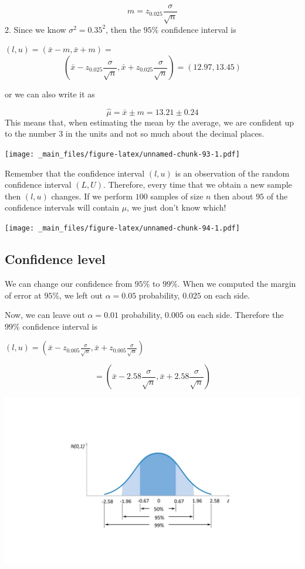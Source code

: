 \documentclass[
]{book}
\begin{document}
\[m=z_{0.025} \frac{\sigma}{\sqrt{n}}\]
2. Since we know \(\sigma^2=0.35^2\), then the \(95\%\) confidence interval is

\((l,u)=(\bar{x} - m, \bar{x} + m)=\) \[(\bar{x}-z_{0.025} \frac{\sigma}{\sqrt{n}}, \bar{x}+z_{0.025} \frac{\sigma}{\sqrt{n}})= (12.97,13.45)\]

or we can also write it as

\[\hat{\mu}=\bar{x}  \pm m = 13.21 \pm 0.24\]
This means that, when estimating the mean by the average, we are confident up to the number 3 in the units and not so much about the decimal places.

\texttt{[image: \_main\_files/figure-latex/unnamed-chunk-93-1.pdf]}

Remember that the confidence interval \((l,u)\) is an observation of the random confidence interval \((L,U)\). Therefore, every time that we obtain a new sample then \((l,u)\) changes. If we perform \(100\) samples of size \(n\) then about \(95\) of the confidence intervals will contain \(\mu\), we just don't know which!

\texttt{[image: \_main\_files/figure-latex/unnamed-chunk-94-1.pdf]}

\hypertarget{confidence-level}{%
\subsection{Confidence level}\label{confidence-level}}

We can change our confidence from \(95\%\) to \(99\%\). When we computed the margin of error at \(95\%\), we left out \(\alpha=0.05\) probability, \(0.025\) on each side.

Now, we can leave out \(\alpha=0.01\) probability, \(0.005\) on each side. Therefore the \(99\%\) confidence interval is

\((l,u) = (\bar{x} - z_{0.005}\frac{\sigma}{\sqrt{n}},\bar{x} + z_{0.005}\frac{\sigma}{\sqrt{n}})\)

\[= (\bar{x} - 2.58\frac{\sigma}{\sqrt{n}},\bar{x} + 2.58\frac{\sigma}{\sqrt{n}})\]

\includegraphics{./figures/phi.JPG}
\end{document}
